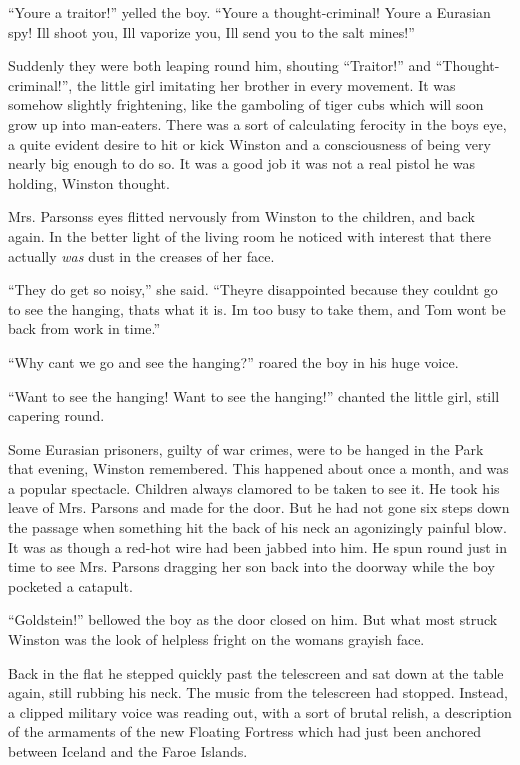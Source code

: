 ``You\textquotesingle re a traitor!'' yelled the boy.
``You\textquotesingle re a thought-criminal! You\textquotesingle re a
Eurasian spy! I\textquotesingle ll shoot you, I\textquotesingle ll
vaporize you, I\textquotesingle ll send you to the salt mines!''

Suddenly they were both leaping round him, shouting ``Traitor!'' and
``Thought-criminal!'', the little girl imitating her brother in every
movement. It was somehow slightly frightening, like the gamboling of
tiger cubs which will soon grow up into man-eaters. There was a sort of
calculating ferocity in the boy\textquotesingle s eye, a quite evident
desire to hit or kick Winston and a consciousness of being very nearly
big enough to do so. It was a good job it was not a real pistol he was
holding, Winston thought.

Mrs. Parsons\textquotesingle s eyes flitted nervously from Winston to
the children, and back again. In the better light of the living room he
noticed with interest that there actually \emph{was} dust in the creases
of her face.

``They do get so noisy,'' she said. ``They\textquotesingle re disappointed
because they couldn\textquotesingle t go to see the hanging,
that\textquotesingle s what it is. I\textquotesingle m too busy to take
them, and Tom won\textquotesingle t be back from work in time.''

``Why can\textquotesingle t we go and see the hanging?'' roared the boy in
his huge voice.

``Want to see the hanging! Want to see the hanging!'' chanted the little
girl, still capering round.

Some Eurasian prisoners, guilty of war crimes, were to be hanged in the
Park that evening, Winston remembered. This happened about once a month,
and was a popular spectacle. Children always clamored to be taken to see
it. He took his leave of Mrs. Parsons and made for the door. But he had
not gone six steps down the passage when something hit the back of his
neck an agonizingly painful blow. It was as though a red-hot wire had
been jabbed into him. He spun round just in time to see Mrs. Parsons
dragging her son back into the doorway while the boy pocketed a
catapult.

``Goldstein!'' bellowed the boy as the door closed on him. But what most
struck Winston was the look of helpless fright on the
woman\textquotesingle s grayish face.

Back in the flat he stepped quickly past the telescreen and sat down at
the table again, still rubbing his neck. The music from the telescreen
had stopped. Instead, a clipped military voice was reading out, with a
sort of brutal relish, a description of the armaments of the new
Floating Fortress which had just been anchored between Iceland and the
Faroe Islands.

